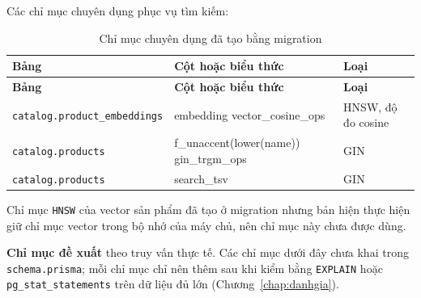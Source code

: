 \noindent Các chỉ mục chuyên dụng phục vụ tìm kiếm:

\begingroup
\tblsetup\tblzebra
\begin{longtable}{L{4.50cm} L{7.00cm} L{3.50cm}}
\caption{Chỉ mục chuyên dụng đã tạo bằng migration}
\label{tab:chimucdaco} \\
\toprule
{}
\textbf{Bảng} & \textbf{Cột hoặc biểu thức} & \textbf{Loại} \\
\midrule
\endfirsthead
\toprule
{}
\textbf{Bảng} & \textbf{Cột hoặc biểu thức} & \textbf{Loại} \\
\midrule
\endhead
\bottomrule
\endfoot
\texttt{catalog.product\_\allowbreak{}embeddings} & embedding vector\_\allowbreak{}cosine\_\allowbreak{}ops & HNSW, độ đo cosine \\
\texttt{catalog.products} & f\_\allowbreak{}unaccent(lower(name)) gin\_\allowbreak{}trgm\_\allowbreak{}ops & GIN \\
\texttt{catalog.products} & search\_\allowbreak{}tsv & GIN \\
\end{longtable}
\endgroup

Chỉ mục \texttt{HNSW} của vector sản phẩm đã tạo ở migration nhưng bản hiện thực hiện giữ chỉ mục vector trong bộ nhớ của máy chủ, nên chỉ mục này chưa được dùng.

\noindent\textbf{Chỉ mục đề xuất} theo truy vấn thực tế. Các chỉ mục dưới đây chưa khai trong \texttt{schema.prisma}; mỗi chỉ mục chỉ nên thêm sau khi kiểm bằng \texttt{EXPLAIN} hoặc \texttt{pg\_\allowbreak{}stat\_\allowbreak{}statements} trên dữ liệu đủ lớn (Chương~\ref{chap:danhgia}).

